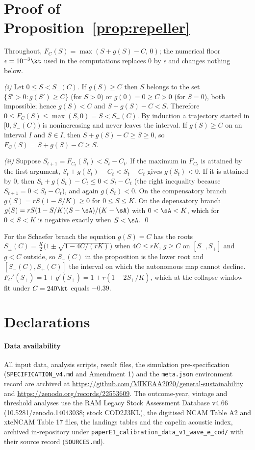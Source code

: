 \appendix
\section{Proof of Proposition~\ref{prop:repeller}}\label{app:proof}

Throughout, $F_C(S) = \max(S + g(S) - C,\,0)$; the numerical floor $\epsilon = 10^{-3}\kt$ used in the computations replaces $0$ by $\epsilon$ and changes nothing below.

\emph{(i)} Let $0 \le S < S_-(C)$. If $g(S) \ge C$ then $S$ belongs to the set $\{S'>0 : g(S')\ge C\}$ (for $S>0$) or $g(0)=0\ge C>0$ (for $S=0$), both impossible; hence $g(S) < C$ and $S + g(S) - C < S$. Therefore $0 \le F_C(S) \le \max(S,0) = S < S_-(C)$. By induction a trajectory started in $[0,S_-(C))$ is nonincreasing and never leaves the interval. If $g(S) \ge C$ on an interval $I$ and $S\in I$, then $S + g(S) - C \ge S \ge 0$, so $F_C(S) = S + g(S) - C \ge S$.

\emph{(ii)} Suppose $S_{t+1} = F_{C_t}(S_t) < S_t - C_t$. If the maximum in $F_{C_t}$ is attained by the first argument, $S_t + g(S_t) - C_t < S_t - C_t$ gives $g(S_t) < 0$. If it is attained by $0$, then $S_t + g(S_t) - C_t \le 0 < S_t - C_t$ (the right inequality because $S_{t+1} = 0 < S_t - C_t$), and again $g(S_t) < 0$. On the compensatory branch $g(S) = rS(1-S/K) \ge 0$ for $0 \le S \le K$. On the depensatory branch $g(S) = rS(1-S/K)(S-\sA)/(K-\sA)$ with $0<\sA<K$, which for $0<S<K$ is negative exactly when $S<\sA$. \qed

For the Schaefer branch the equation $g(S)=C$ has the roots $S_\pm(C) = \tfrac{K}{2}\bigl(1\pm\sqrt{1-4C/(rK)}\bigr)$ when $4C\le rK$, $g\ge C$ on $[S_-,S_+]$ and $g<C$ outside, so $S_-(C)$ in the proposition is the lower root and $[S_-(C),S_+(C)]$ the interval on which the autonomous map cannot decline. $F_C'(S_+) = 1 + g'(S_+) = 1 + r(1-2S_+/K)$, which at the collapse-window fit under $C=240\kt$ equals $-0.39$.

\section*{Declarations}

\paragraph{Data availability} All input data, analysis scripts, result files, the simulation pre-specification (\texttt{SPECIFICATION\_v4.md} and Amendment 1) and the \texttt{meta.json} environment record are archived at \url{https://github.com/MIKEAA2020/general-sustainability} and \url{https://zenodo.org/records/22553609}. The outcome-year, vintage and threshold analyses use the RAM Legacy Stock Assessment Database v4.66 (10.5281/zenodo.14043038; stock COD2J3KL), the digitised NCAM Table A2 and xteNCAM Table 17 files, the landings tables and the capelin acoustic index, archived in-repository under \texttt{paperE1\_calibration\_data\_v1\_wave\_e\_cod/} with their source record (\texttt{SOURCES.md}).

